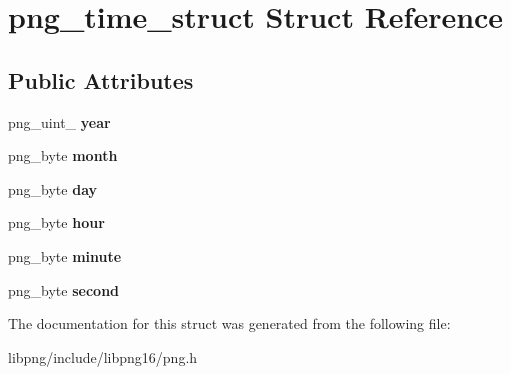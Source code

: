 \hypertarget{structpng__time__struct}{\section{png\-\_\-time\-\_\-struct Struct Reference}
\label{structpng__time__struct}
}
\subsection*{Public Attributes}
\begin{DoxyCompactItemize}
\item 
\hypertarget{structpng__time__struct_a5cceb6213fc7b4462435ea1d8fc1c798}{png\-\_\-uint\-\_ {\bfseries year}}\label{structpng__time__struct_a5cceb6213fc7b4462435ea1d8fc1c798}

\item 
\hypertarget{structpng__time__struct_a3ab550977ee2cb1165c0398131f2e601}{png\-\_\-byte {\bfseries month}}\label{structpng__time__struct_a3ab550977ee2cb1165c0398131f2e601}

\item 
\hypertarget{structpng__time__struct_afa0f94516a676178d1dabeb96eccdcdb}{png\-\_\-byte {\bfseries day}}\label{structpng__time__struct_afa0f94516a676178d1dabeb96eccdcdb}

\item 
\hypertarget{structpng__time__struct_a79ac8b217254fd87cdc7299e6612a6f4}{png\-\_\-byte {\bfseries hour}}\label{structpng__time__struct_a79ac8b217254fd87cdc7299e6612a6f4}

\item 
\hypertarget{structpng__time__struct_ad3ce11e9d92b77a33b3f7480bf0fff8c}{png\-\_\-byte {\bfseries minute}}\label{structpng__time__struct_ad3ce11e9d92b77a33b3f7480bf0fff8c}

\item 
\hypertarget{structpng__time__struct_a84e528e4c4c7d76cd2252e0d0d2ed0c9}{png\-\_\-byte {\bfseries second}}\label{structpng__time__struct_a84e528e4c4c7d76cd2252e0d0d2ed0c9}

\end{DoxyCompactItemize}


The documentation for this struct was generated from the following file\-:\begin{DoxyCompactItemize}
\item 
libpng/include/libpng16/png.\-h\end{DoxyCompactItemize}
